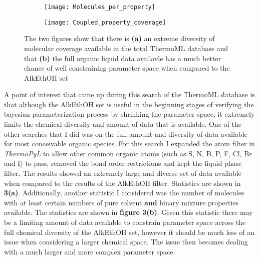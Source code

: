 \documentclass[rmp,nofootinbib,superscriptaddress,12pt,tightenlines,notitlepage]{revtex4-1}
\begin{document}
\begin{figure}[h!]
\centering
\begin{subfigure}{.5\textwidth}
  \centering
  \texttt{[image: Molecules\_per\_property]}
  \label{fig:sub1}
\end{subfigure}%
\begin{subfigure}{.5\textwidth}
  \centering
  \texttt{[image: Coupled\_property\_coverage]}
  \label{fig:sub2}
\end{subfigure}
\caption{The two figures show that there is \textbf{(a)} an extreme diversity of molecular coverage available in the total ThermoML database and that \textbf{(b)} the full organic liquid data availavle has a much better chance of well constraining parameter space when compared to the AlkEthOH set}
\label{fig:test}
\end{figure}
A point of interest that came up during this search of the ThermoML database is that although the AlkEthOH set is useful in the beginning stages
of verifying the bayesian parameterization process by shrinking the parameter space, it extremely limits the chemical diversity and amount of 
data that is available. One of the other searches that I did was on the full amount and diversity of data available for most conceivable organic
species. For this search I expanded the atom filter in \textit{ThermoPyL} to allow other common organic atoms (such as S, N, B, P, F, Cl, Br and I) to
pass, removed the bond order restrictions and kept the liquid phase filter. The results showed an extremely large and diverse set of data available when
compared to the results of the AlkEthOH filter. Statistics are shown in \textbf{3(a)}. Additionally, another statistic I considered was the number 
of molecules with at least certain numbers of pure solvent \textbf{and} binary mixture properties available. The statistics are shown in \textbf{figure 3(b)}. 
Given this statistic there may be a limiting amount of data available to constrain parameter space across the full chemical diversity of the AlkEthOH set, 
however it should be much less of an issue when considering a larger chemical space. The issue then becomes dealing with a much larger and more 
complex parameter space.
\end{document}
